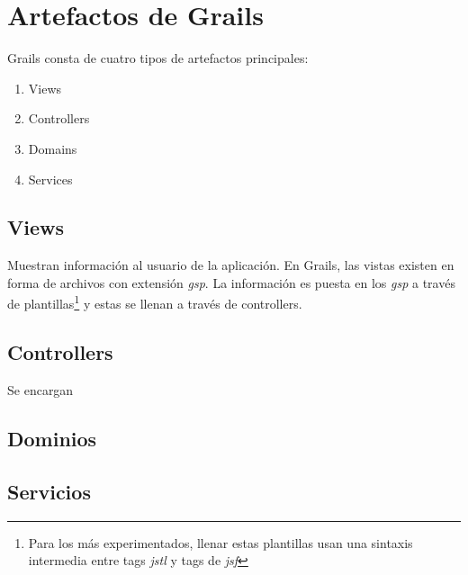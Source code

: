 \newpage
\section{Artefactos de Grails}
Grails consta de cuatro tipos de artefactos principales:
\begin{enumerate}
 \item Views
 \item Controllers
 \item Domains
 \item Services
\end{enumerate}

\subsection{Views}
Muestran informaci\'on al usuario de la aplicaci\'on. En Grails, las vistas existen en forma de archivos con extensi\'on \textit{gsp}. La informaci\'on es puesta en los \textit{gsp} a trav\'es de plantillas\footnote{Para los m\'as experimentados, llenar estas plantillas usan una sintaxis intermedia entre tags \textit{jstl} y tags de \textit{jsf}} y estas se llenan a trav\'es de controllers. 

\subsection{Controllers}
Se encargan 
\subsection{Dominios}
\subsection{Servicios}